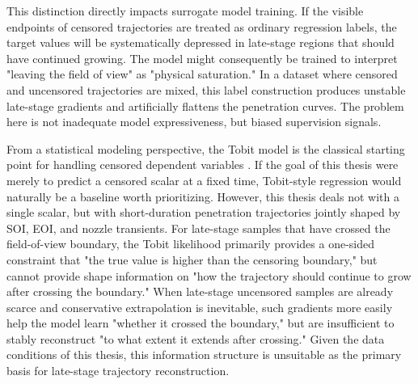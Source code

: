 This distinction directly impacts surrogate model training.
If the visible endpoints of censored trajectories are treated as ordinary regression labels, the target values will be systematically depressed in late-stage regions that should have continued growing.
The model might consequently be trained to interpret "leaving the field of view" as "physical saturation."
In a dataset where censored and uncensored trajectories are mixed, this label construction produces unstable late-stage gradients and artificially flattens the penetration curves.
The problem here is not inadequate model expressiveness, but biased supervision signals.

From a statistical modeling perspective, the Tobit model is the classical starting point for handling censored dependent variables \cite{Tobin1958}.
If the goal of this thesis were merely to predict a censored scalar at a fixed time, Tobit-style regression would naturally be a baseline worth prioritizing.
However, this thesis deals not with a single scalar, but with short-duration penetration trajectories jointly shaped by SOI, EOI, and nozzle transients.
For late-stage samples that have crossed the field-of-view boundary, the Tobit likelihood primarily provides a one-sided constraint that "the true value is higher than the censoring boundary,"
but cannot provide shape information on "how the trajectory should continue to grow after crossing the boundary."
When late-stage uncensored samples are already scarce and conservative extrapolation is inevitable, such gradients more easily help the model learn "whether it crossed the boundary,"
but are insufficient to stably reconstruct "to what extent it extends after crossing."
Given the data conditions of this thesis, this information structure is unsuitable as the primary basis for late-stage trajectory reconstruction.

